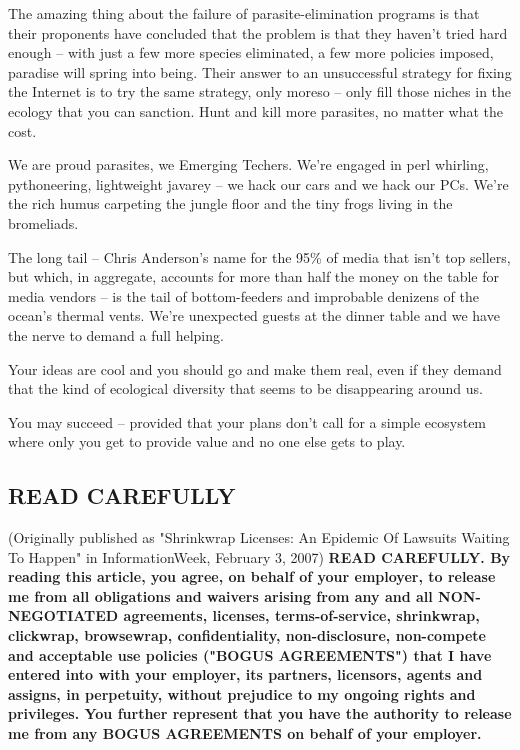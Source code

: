 The amazing thing about the failure of parasite-elimination
programs is that their proponents have concluded that the problem
is that they haven't tried hard enough -- with just a few more
species eliminated, a few more policies imposed, paradise will
spring into being. Their answer to an unsuccessful strategy for
fixing the Internet is to try the same strategy, only moreso --
only fill those niches in the ecology that you can sanction. Hunt
and kill more parasites, no matter what the cost.

We are proud parasites, we Emerging Techers. We're engaged in perl
whirling, pythoneering, lightweight javarey -- we hack our cars and
we hack our PCs. We're the rich humus carpeting the jungle floor
and the tiny frogs living in the bromeliads.

The long tail -- Chris Anderson's name for the 95\% of media that
isn't top sellers, but which, in aggregate, accounts for more than
half the money on the table for media vendors -- is the tail of
bottom-feeders and improbable denizens of the ocean's thermal
vents. We're unexpected guests at the dinner table and we have the
nerve to demand a full helping.

Your ideas are cool and you should go and make them real, even if
they demand that the kind of ecological diversity that seems to be
disappearing around us.

You may succeed -- provided that your plans don't call for a simple
ecosystem where only you get to provide value and no one else gets
to play.

\subsection{READ CAREFULLY}

(Originally published as "Shrinkwrap Licenses: An Epidemic Of
Lawsuits Waiting To Happen" in InformationWeek, February 3, 2007)
\textbf{READ CAREFULLY. By reading this article, you agree, on behalf of your employer, to release me from all obligations and waivers arising from any and all NON-NEGOTIATED agreements, licenses, terms-of-service, shrinkwrap, clickwrap, browsewrap, confidentiality, non-disclosure, non-compete and acceptable use policies ("BOGUS AGREEMENTS") that I have entered into with your employer, its partners, licensors, agents and assigns, in perpetuity, without prejudice to my ongoing rights and privileges. You further represent that you have the authority to release me from any BOGUS AGREEMENTS on behalf of your employer.}

